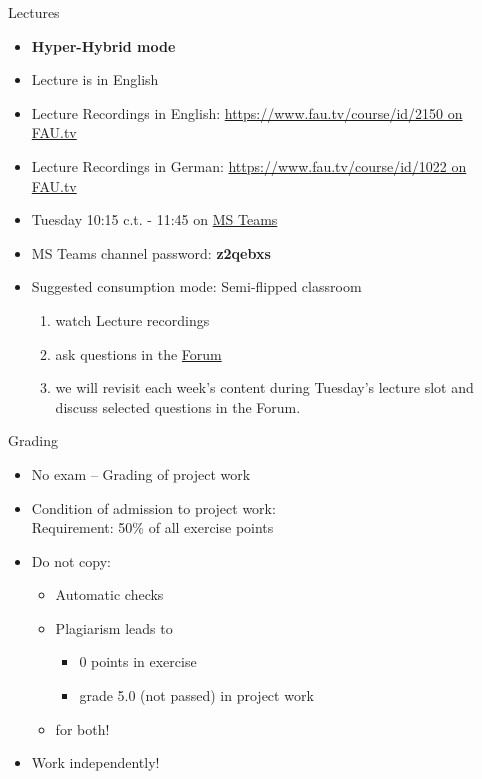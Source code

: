 \begin{frame}[c]{Lectures}
	\begin{itemize}
		\setlength\itemsep{0.4cm}
		\item \textbf{Hyper-Hybrid mode}
		\item Lecture is in English
		\item Lecture Recordings in English: \href{https://www.fau.tv/course/id/2150}{https://www.fau.tv/course/id/2150 on FAU.tv}
		\item Lecture Recordings in German: \href{https://www.fau.tv/course/id/1022}{https://www.fau.tv/course/id/1022 on FAU.tv}
		\item Tuesday 10:15 c.t. - 11:45 on \href{https://teams.microsoft.com/l/team/19\%3adRCxup9jUsjM31xr9T4jdAFDB-ImEk_lU5Fy05ijYx81\%40thread.tacv2/conversations?groupId=6b2df36b-cec0-46b3-83d2-b4e6d1c6ac30\&tenantId=b2efcef3-8496-40b8-9de8-f135982f3461}{MS Teams}
		\item MS Teams channel password: \textbf{z2qebxs}
		\item Suggested consumption mode: Semi-flipped classroom 
		\begin{enumerate}
			\item watch Lecture recordings
			\item ask questions in the \href{https://www.studon.fau.de/studon/goto.php?target=frm_4286923}{Forum}
			\item we will revisit each week's content during Tuesday's lecture slot and discuss selected questions in the Forum.   
		\end{enumerate}
	\end{itemize}
\end{frame}

\begin{frame}[c]{Grading}
	\begin{itemize}
		\setlength\itemsep{0.4cm}
		\item No exam -- Grading of project work
		\item Condition of admission to project work:\\
		      Requirement: 50\% of all exercise points
		\item Do not copy:
		      \begin{itemize}
			      \item Automatic checks
			      \item Plagiarism leads to
			            \begin{itemize}
				            \item 0 points in exercise
				            \item grade 5.0 (not passed) in project work
			            \end{itemize}
			      \item for both!
		      \end{itemize}
		\item Work independently!
	\end{itemize}
\end{frame}

